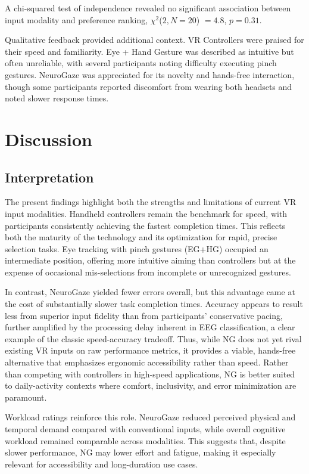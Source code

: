 \documentclass[utf8]{FrontiersinHarvard} %
\begin{document}
A chi-squared test of independence revealed no significant association between input modality and preference ranking, $\chi^2$($2, N = 20$) $= 4.8$, $p = 0.31$.

Qualitative feedback provided additional context. VR Controllers were praised for their speed and familiarity. Eye + Hand Gesture was described as intuitive but often unreliable, with several participants noting difficulty executing pinch gestures. NeuroGaze was appreciated for its novelty and hands-free interaction, though some participants reported discomfort from wearing both headsets and noted slower response times.

\section{Discussion}
\subsection{Interpretation}
The present findings highlight both the strengths and limitations of current VR input modalities. Handheld controllers remain the benchmark for speed, with participants consistently achieving the fastest completion times. This reflects both the maturity of the technology and its optimization for rapid, precise selection tasks. Eye tracking with pinch gestures (EG+HG) occupied an intermediate position, offering more intuitive aiming than controllers but at the expense of occasional mis-selections from incomplete or unrecognized gestures.

In contrast, NeuroGaze yielded fewer errors overall, but this advantage came at the cost of substantially slower task completion times. Accuracy appears to result less from superior input fidelity than from participants’ conservative pacing, further amplified by the processing delay inherent in EEG classification, a clear example of the classic speed-accuracy tradeoff. Thus, while NG does not yet rival existing VR inputs on raw performance metrics, it provides a viable, hands-free alternative that emphasizes ergonomic accessibility \citep{101371,6451193} rather than speed. Rather than competing with controllers in high-speed applications, NG is better suited to daily-activity contexts where comfort, inclusivity, and error minimization are paramount.

Workload ratings reinforce this role. NeuroGaze reduced perceived physical and temporal demand compared with conventional inputs, while overall cognitive workload remained comparable across modalities. This suggests that, despite slower performance, NG may lower effort and fatigue, making it especially relevant for accessibility and long-duration use cases.
\end{document}
